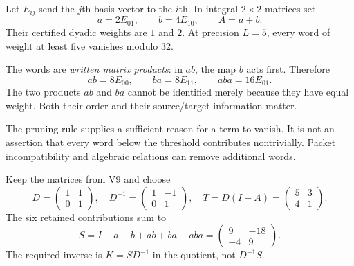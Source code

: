 Let $E_{ij}$ send the $j$th basis vector to the $i$th. In integral $2\times2$ matrices set
\[
a=2E_{01},\qquad b=4E_{10},\qquad A=a+b.
\]
Their certified dyadic weights are $1$ and $2$. At precision $L=5$, every word of weight at least five vanishes modulo $32$.


The words are \emph{written matrix products}: in $ab$, the map $b$ acts first. Therefore
\[
ab=8E_{00},\qquad ba=8E_{11},\qquad aba=16E_{01}.
\]
The two products $ab$ and $ba$ cannot be identified merely because they have equal weight. Both their order and their source/target information matter.

The pruning rule supplies a sufficient reason for a term to vanish. It is not an assertion that every word below the threshold contributes nontrivially. Packet incompatibility and algebraic relations can remove additional words.


Keep the matrices from V9 and choose
\[
D=\begin{pmatrix}1&1\\0&1\end{pmatrix},\quad
D^{-1}=\begin{pmatrix}1&-1\\0&1\end{pmatrix},\quad
T=D(I+A)=\begin{pmatrix}5&3\\4&1\end{pmatrix}.
\]
The six retained contributions sum to
\[
S=I-a-b+ab+ba-aba
=\begin{pmatrix}9&-18\\-4&9\end{pmatrix}.
\]
The required inverse is $K=SD^{-1}$ in the quotient, not $D^{-1}S$.

